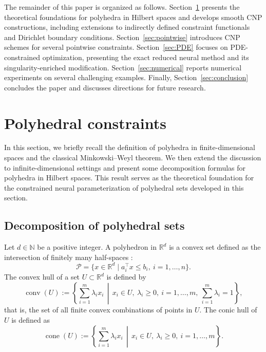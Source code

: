 \documentclass{article}
\numberwithin{equation}{section}
\begin{document}
The remainder of this paper is organized as follows. 
Section~\ref{sec:polyhedral} presents the theoretical foundations for polyhedra in Hilbert spaces and develops smooth CNP constructions, including extensions to indirectly defined constraint functionals and Dirichlet boundary conditions. 
Section~\ref{sec:pointwise} introduces CNP schemes for several pointwise constraints. 
Section~\ref{sec:PDE} focuses on PDE-constrained optimization, presenting the exact reduced neural method and its singularity-enriched modification. 
Section~\ref{sec:numerical} reports numerical experiments on several challenging examples. 
Finally, Section~\ref{sec:conclusion} concludes the paper and discusses directions for future research.

\section{Polyhedral constraints}
\label{sec:polyhedral}

In this section, we briefly recall the definition of polyhedra in finite-dimensional spaces and the classical Minkowski--Weyl theorem. We then extend the discussion to infinite-dimensional settings and present some decomposition formulas for polyhedra in Hilbert spaces. This result serves as the theoretical foundation for the constrained neural parameterization of polyhedral sets developed in this section.

\subsection{Decomposition of polyhedral sets}

Let $d\in \mathbb{N}$ be a positive integer. A polyhedron in $\mathbb{R}^d$ is a convex set defined as the intersection of finitely many half-spaces \cite{boyd2004convex}:
\begin{equation}
    \mathcal{P}=\{x\in \mathbb{R}^d \mid a_i^\top x\le b_i,\ i=1,\dots,n\}.
\end{equation}
The convex hull of a set $U\subset \mathbb{R}^d$ is defined by \cite{boyd2004convex}
\begin{equation}
    \operatorname{conv}(U)
    :=
    \left\{
    \sum_{i=1}^m \lambda_i x_i
    \,\middle|\,
    x_i\in U,\ \lambda_i\ge 0,\ i=1,\dots,m,\ \sum_{i=1}^m \lambda_i=1
    \right\},
\end{equation}
that is, the set of all finite convex combinations of points in $U$. The conic hull of $U$ is defined as \cite{boyd2004convex}
\begin{equation}
    \operatorname{cone}(U)
    :=
    \left\{
    \sum_{i=1}^m \lambda_i x_i
    \,\middle|\,
    x_i\in U,\ \lambda_i\ge 0,\ i=1,\dots,m
    \right\}.
\end{equation}
\end{document}
